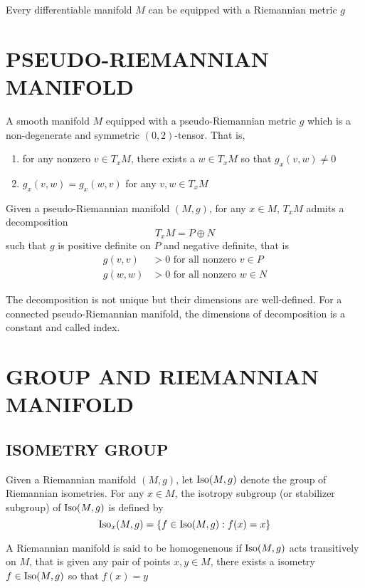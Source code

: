 \begin{theorem}
	Every differentiable manifold $M$ can be equipped with a Riemannian metric $g$
\end{theorem}

\section{PSEUDO-RIEMANNIAN MANIFOLD}

\begin{definition}
	A smooth manifold $M$ equipped with a pseudo-Riemannian metric $g$ which is a non-degenerate and symmetric $(0, 2)$-tensor. That is,
	\begin{enumerate}
		\item for any nonzero $v \in T_x M$, there exists a $w \in T_x M$ so that $g_x(v, w) \neq 0$
		\item $g_x(v, w) = g_x(w, v)$ for any $v, w \in T_x M$
	\end{enumerate}
\end{definition}

\begin{remark}[index]
	Given a pseudo-Riemannian manifold $(M, g)$, for any $x \in M$, $T_x M$ admits a decomposition
	$$
		T_x M = P \oplus N
	$$
	such that $g$ is positive definite on $P$ and negative definite, that is
	\begin{align*}
		g(v, v) &> 0 \text{ for all nonzero } v \in P \\
		g(w, w) &> 0 \text{ for all nonzero } w \in N
	\end{align*}
	
	The decomposition is not unique but their dimensions are well-defined. For a connected pseudo-Riemannian manifold, the dimensions of decomposition is a constant and called index.
\end{remark}

\section{GROUP AND RIEMANNIAN MANIFOLD}

\subsection{ISOMETRY GROUP}

\begin{definition}
	Given a Riemannian manifold $(M, g)$, let $\operatorname{Iso}(M, g)$ denote the group of Riemannian isometries. For any $x \in M$, the isotropy subgroup (or stabilizer subgroup) of $\operatorname{Iso}(M, g)$ is defined by
	$$
		\operatorname{Iso}_x(M, g) = \{f \in \operatorname{Iso}(M, g): f(x) = x\}
	$$
	
	A Riemannian manifold is said to be homogenenous if $\operatorname{Iso}(M, g)$ acts transitively on $M$, that is given any pair of points $x, y \in M$, there exists a isometry $f \in \operatorname{Iso}(M, g)$ so that $f(x) = y$
\end{definition}

